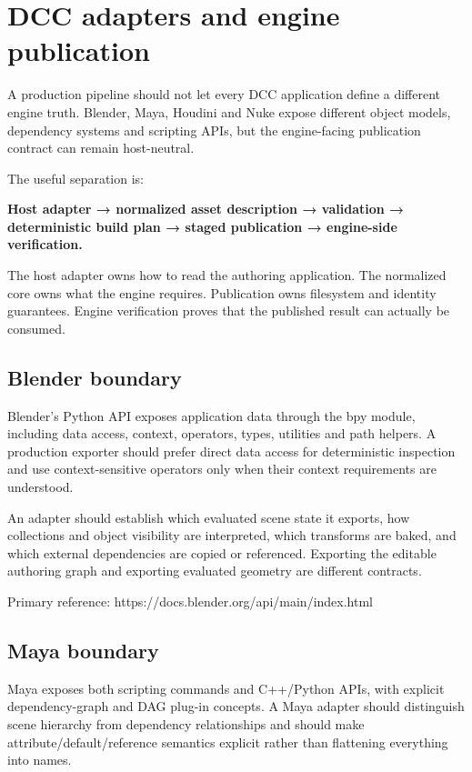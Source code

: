 \hypertarget{appendix-03ade9e1875f}{}\label{referencestart:appendix-03ade9e1875f}
\section{DCC adapters and engine publication}\label{appendix-03ade9e1875f-dcc-adapters-and-engine-publication}

A production pipeline should not let every DCC application define a different engine truth. Blender, Maya, Houdini and Nuke expose different object models, dependency systems and scripting APIs, but the engine-facing publication contract can remain host-neutral.

The useful separation is:

\textbf{Host adapter → normalized asset description → validation → deterministic build plan → staged publication → engine-side verification.}

The host adapter owns how to read the authoring application. The normalized core owns what the engine requires. Publication owns filesystem and identity guarantees. Engine verification proves that the published result can actually be consumed.

\subsection{Blender boundary}\label{appendix-03ade9e1875f-blender-boundary}

Blender's Python API exposes application data through the bpy module, including data access, context, operators, types, utilities and path helpers. A production exporter should prefer direct data access for deterministic inspection and use context-sensitive operators only when their context requirements are understood.

An adapter should establish which evaluated scene state it exports, how collections and object visibility are interpreted, which transforms are baked, and which external dependencies are copied or referenced. Exporting the editable authoring graph and exporting evaluated geometry are different contracts.

Primary reference: https://docs.blender.org/api/main/index.html

\subsection{Maya boundary}\label{appendix-03ade9e1875f-maya-boundary}

Maya exposes both scripting commands and C++/Python APIs, with explicit dependency-graph and DAG plug-in concepts. A Maya adapter should distinguish scene hierarchy from dependency relationships and should make attribute/default/reference semantics explicit rather than flattening everything into names.

